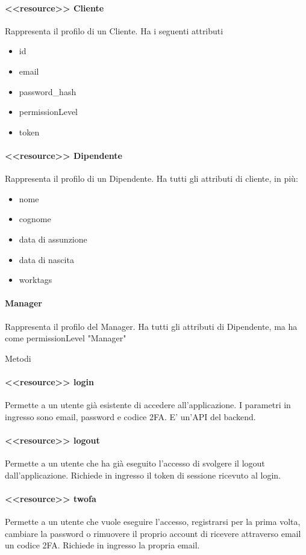 \documentclass{report}
\begin{document}
\paragraph*{<<resource>> Cliente}
Rappresenta il profilo di un Cliente.
Ha i seguenti attributi
\begin{itemize}
	\item id
	\item email
	\item password\_hash
	\item permissionLevel
	\item token
\end{itemize}
\paragraph*{<<resource>> Dipendente}
Rappresenta il profilo di un Dipendente. 
Ha tutti gli attributi di cliente, in più:
\begin{itemize}
	\item nome
	\item cognome
	\item data di assunzione
	\item data di nascita
	\item worktags
\end{itemize} 
\paragraph*{Manager}
Rappresenta il profilo del Manager.
Ha tutti gli attributi di Dipendente, ma ha come permissionLevel "Manager"

Metodi
\paragraph{<<resource>> login}
Permette a un utente già esistente di accedere all'applicazione.
I parametri in ingresso sono email, password e codice 2FA.
E' un'API del backend.

\paragraph*{<<resource>> logout}
Permette a un utente che ha già eseguito l'accesso di svolgere il logout dall'applicazione.
Richiede in ingresso il token di sessione ricevuto al login.

\paragraph*{<<resource>> twofa}
Permette a un utente che vuole eseguire l'accesso, registrarsi per la prima volta, cambiare la password o rimuovere il proprio account di ricevere attraverso email un codice 2FA.
Richiede in ingresso la propria email.
\end{document}
